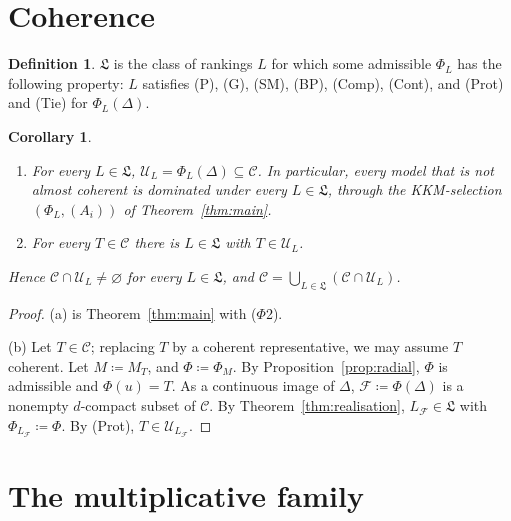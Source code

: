 \documentclass[11pt]{article}
\newcommand{\chg}[1]{{\color{red}#1}}
\newtheorem{corollary}[theorem]{Corollary}
\theoremstyle{definition}
\newtheorem{definition}[theorem]{Definition}
\theoremstyle{remark}
\newcommand{\C}{\mathcal C}
\newcommand{\U}{\mathcal U}
\newcommand{\F}{\mathcal F}
\newcommand{\Lf}{\mathfrak L}
\begin{document}
\section{Coherence}\label{sec:coherence}

\begin{definition}\label{def:class}
$\Lf$ is the class of rankings $L$ for which some admissible $\Phi_L$ has the following property: $L$ satisfies (P), (G), (SM), (BP), (Comp), (Cont), and (Prot) and (Tie) for $\Phi_L(\Delta)$.
\end{definition}

\begin{corollary}\label{cor:coherence}
\begin{enumerate}[label=\textup{(\alph*)}]
\item For every $L\in\Lf$, $\U_L=\Phi_L(\Delta)\subseteq\C$. In particular, every model that is not almost coherent is dominated under every $L\in\Lf$, through the KKM-selection $(\Phi_L,(A_i))$ of Theorem~\ref{thm:main}.
\item For every $T\in\C$ there is $L\in\Lf$ with $T\in\U_L$.
\end{enumerate}
Hence $\C\cap\U_L\neq\varnothing$ for every $L\in\Lf$, and $\C=\bigcup_{L\in\Lf}(\C\cap\U_L)$.
\end{corollary}
\begin{proof}
(a) is Theorem~\ref{thm:main} with ($\Phi$2).

(b) \chg{Let $T\in\C$; replacing $T$ by a coherent representative, we may assume $T$ coherent. Let} $M\coloneqq M_T$, and $\Phi\coloneqq\Phi_M$. By Proposition~\ref{prop:radial}, $\Phi$ is admissible and $\Phi(u)=T$. As a continuous image of $\Delta$, $\F\coloneqq\Phi(\Delta)$ is a nonempty $d$-compact subset of $\C$. By Theorem~\ref{thm:realisation}, $L_\F\in\Lf$ with $\Phi_{L_\F}\coloneqq\Phi$. By (Prot), $T\in\U_{L_\F}$.
\end{proof}

\section{The multiplicative family}\label{sec:multiplicative}
\end{document}
